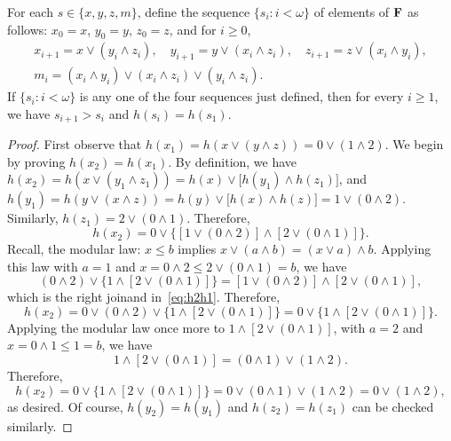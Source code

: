 \begin{lemma}\label{claim:2.3}
  For each $s \in \{x, y, z, m\}$, define the sequence $\{s_i : i < \omega\}$
  of elements of $\mathbf{F}$ as follows: 
  $x_0 = x$, $y_0 = y$, $z_0 = z$, and for $i\geqslant 0$, 
  \begin{gather*}
    x_{i+1} = x\vee (y_i \wedge z_i), \quad  y_{i+1} = y\vee (x_i \wedge z_i), \quad  z_{i+1} = z\vee (x_i \wedge y_i),\\
    m_i = (x_i \wedge y_i) \vee (x_i \wedge z_i) \vee (y_i \wedge z_i).
  \end{gather*}
    If $\{s_i : i< \omega\}$ is any one of the four sequences just defined, then for every $i\geq 1$, 
    we have $s_{i+1} > s_i$ and $h(s_{i}) = h(s_1)$.
  \end{lemma}
  \begin{proof}
First observe that $h(x_1) = h(x \vee (y \wedge z)) = 0 \vee (1 \wedge 2)$.  We begin by proving 
$h(x_{2}) = h(x_1)$.
By definition, we have 
$h(x_{2}) = h(x \vee (y_1 \wedge z_1)) = h(x) \vee \bigl[h(y_1) \wedge h(z_1)\bigr]$,
and $h(y_1) = h(y \vee (x \wedge z)) =   h(y) \vee \bigl[h(x) \wedge h(z)\bigr] 
= 1 \vee (0 \wedge 2)$. Similarly, $h(z_1) = 2 \vee (0 \wedge 1)$.
Therefore, 
\begin{equation}\label{eq:h2h1} 
  h(x_{2}) = 
0 \vee \bigl\{[1 \vee (0 \wedge 2)] \wedge [2 \vee (0 \wedge 1)]\bigr\}.
\end{equation}
Recall, the modular law: 
$x \leq b$ implies $x \vee (a \wedge b) = (x \vee a) \wedge b$.
Applying this law with $a = 1$ and $x = 0 \wedge 2 \leq 2 \vee (0 \wedge 1) = b$, we have 
\[
  (0 \wedge 2) \vee \bigl\{ 1 \wedge [2 \vee (0 \wedge 1)]\bigr\} = [1 \vee (0 \wedge 2)] \wedge [2 \vee (0 \wedge 1)],
\]  
which is the right joinand in~\ref{eq:h2h1}.  Therefore,
\[
  h(x_{2}) = 
  0 \vee 
  (0 \wedge 2) \vee \bigl\{ 1 \wedge [2 \vee (0 \wedge 1)]\bigr\} = 
  0 \vee 
  \bigl\{ 1 \wedge [2 \vee (0 \wedge 1)]\bigr\}.
\]
Applying the modular law once more to $1 \wedge [2 \vee (0 \wedge 1)]$, 
with $a = 2$ and $x = 0\wedge 1 \leq 1 = b$, we have
\[
  1 \wedge [2 \vee (0 \wedge 1)]  = (0 \wedge 1) \vee (1\wedge 2).
\]
Therefore,
\[
  h(x_{2}) = 
  0 \vee 
  \bigl\{ 1 \wedge [2 \vee (0 \wedge 1)]\bigr\} = 
  0 \vee (0 \wedge 1) \vee (1\wedge 2) = 0 \vee (1\wedge 2),
 \] 
as desired. 
Of course, $h(y_{2}) = h(y_1)$ and $h(z_{2}) = h(z_1)$ can be checked similarly.


\end{proof}
